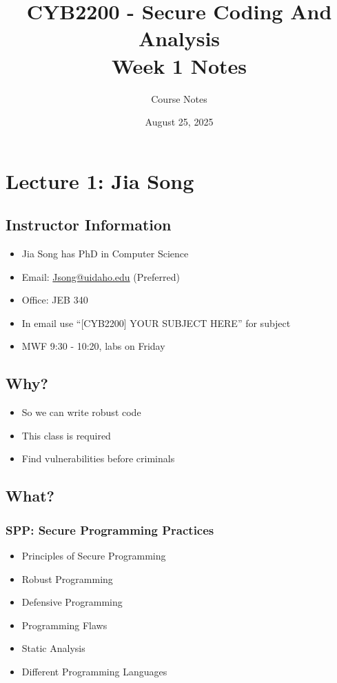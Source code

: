 \documentclass[11pt,a4paper]{article}
\begin{document}
\title{CYB2200 - Secure Coding And Analysis\\Week 1 Notes}
\author{Course Notes}
\date{August 25, 2025}
\maketitle

\tableofcontents
\newpage

\section{Lecture 1: Jia Song}

\subsection{Instructor Information}
\begin{itemize}
    \item Jia Song has PhD in Computer Science
    \item Email: \href{mailto:Jsong@uidaho.edu}{Jsong@uidaho.edu} (Preferred)
    \item Office: JEB 340
    \item In email use ``[CYB2200] YOUR SUBJECT HERE'' for subject
    \item MWF 9:30 - 10:20, labs on Friday
\end{itemize}

\subsection{Why?}
\begin{itemize}
    \item So we can write robust code
    \item This class is required
    \item Find vulnerabilities before criminals
\end{itemize}

\subsection{What?}

\subsubsection{SPP: Secure Programming Practices}
\begin{itemize}
    \item Principles of Secure Programming
    \item Robust Programming
    \item Defensive Programming
    \item Programming Flaws
    \item Static Analysis
    \item Different Programming Languages
\end{itemize}
\end{document}
